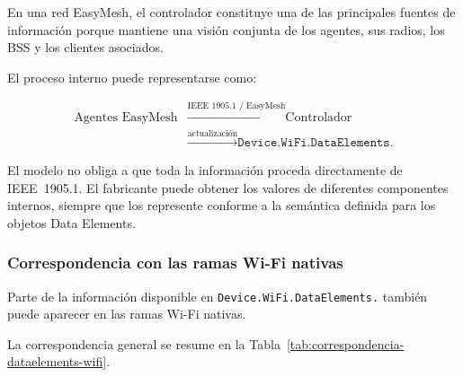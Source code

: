 En una red EasyMesh, el controlador constituye una de las principales
fuentes de información porque mantiene una visión conjunta de los
agentes, sus radios, los BSS y los clientes asociados.

El proceso interno puede representarse como:

\[
\begin{aligned}
    \text{Agentes EasyMesh}
    &\xrightarrow{\text{IEEE~1905.1 / EasyMesh}}
    \text{Controlador}\\
    &\xrightarrow{\text{actualización}}
    \texttt{Device.WiFi.DataElements.}
\end{aligned}
\]

El modelo no obliga a que toda la información proceda directamente de
IEEE~1905.1. El fabricante puede obtener los valores de diferentes
componentes internos, siempre que los represente conforme a la semántica
definida para los objetos Data Elements.


\subsubsection*{Correspondencia con las ramas Wi-Fi nativas}

Parte de la información disponible en
\texttt{Device.WiFi.DataElements.} también puede aparecer en las ramas
Wi-Fi nativas.

La correspondencia general se resume en la
Tabla~\ref{tab:correspondencia-dataelements-wifi}.

